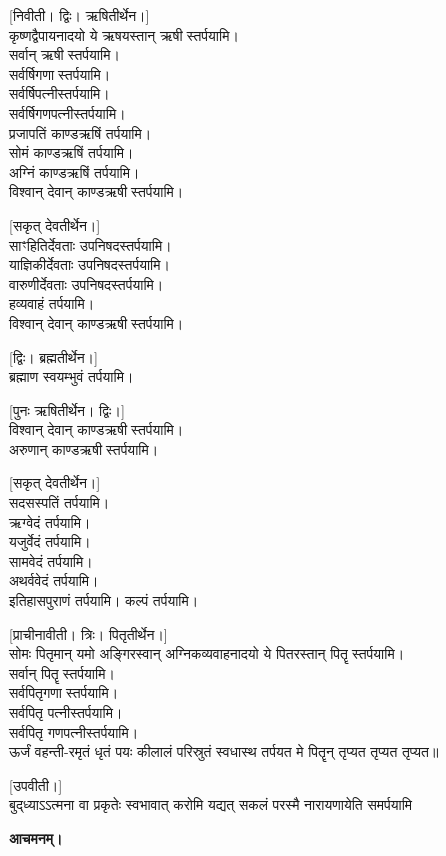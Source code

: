 {\scriptsize [निवीती। द्विः। ऋषितीर्थेन।]}\\
कृष्णद्वैपायनादयो ये ऋषयस्तान् ऋषीस्तर्पयामि।\\
सर्वान् ऋषीस्तर्पयामि।\\
सर्वर्षिगणास्तर्पयामि।\\
सर्वर्षिपत्नीस्तर्पयामि।\\
सर्वर्षिगणपत्नीस्तर्पयामि।\\
प्रजापतिं काण्डऋषिं तर्पयामि।\\
सोमं काण्डऋषिं तर्पयामि।\\
अग्निं काण्डऋषिं तर्पयामि।\\
विश्वान् देवान् काण्डऋषीस्तर्पयामि।
\pagebreak[4]

{\scriptsize [सकृत् देवतीर्थेन।]}\\
साꣳहितिर्देवताः उपनिषदस्तर्पयामि।\\
याज्ञिकीर्देवताः उपनिषदस्तर्पयामि।\\
वारुणीर्देवताः उपनिषदस्तर्पयामि।\\
हव्यवाहं तर्पयामि।\\
विश्वान् देवान् काण्डऋषीस्तर्पयामि।

{\scriptsize [द्विः। ब्रह्मतीर्थेन।]}\\
ब्रह्माण स्वयम्भुवं तर्पयामि।

{\scriptsize [पुनः ऋषितीर्थेन। द्विः।]}\\
विश्वान् देवान् काण्डऋषीस्तर्पयामि।\\
अरुणान् काण्डऋषीस्तर्पयामि।

{\scriptsize [सकृत् देवतीर्थेन।]}\\
सदसस्पतिं तर्पयामि।\\
ऋग्वेदं तर्पयामि।\\
यजुर्वेदं तर्पयामि।\\
सामवेदं तर्पयामि।\\
अथर्ववेदं तर्पयामि।\\
इतिहासपुराणं तर्पयामि। कल्पं तर्पयामि।

{\scriptsize [प्राचीनावीती। त्रिः। पितृतीर्थेन।]}\\
सोमः पितृमान् यमो अङ्गिरस्वान् अग्निकव्यवाहनादयो ये पितरस्तान् पितॄस्तर्पयामि।\\
सर्वान् पितॄस्तर्पयामि।\\
सर्वपितृगणास्तर्पयामि।\\
सर्वपितृ पत्नीस्तर्पयामि।\\
सर्वपितृ गणपत्नीस्तर्पयामि।\\
ऊर्जं वहन्ती-रमृतं धृतं पयः कीलालं परिस्रुतं स्वधास्थ तर्पयत मे पितॄन् तृप्यत तृप्यत तृप्यत॥

{\scriptsize [उपवीती।]}\\
\vspace{-3ex}
{बुद्‌ध्याऽऽत्मना वा प्रकृतेः स्वभावात्}
{करोमि यद्यत् सकलं परस्मै}
{नारायणायेति समर्पयामि}

\textbf{आचमनम्।}

